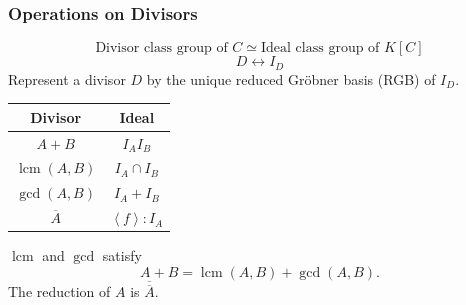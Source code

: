 \documentclass{beamer}
\newcommand{\pid}[1]{\left\langle #1 \right\rangle}
\newcommand{\bb}[1]{\mathbb{#1}}
\DeclareMathOperator{\Char}{char}
\DeclareMathOperator{\lcm}{lcm}
\renewcommand{\bar}{\overline}
\begin{document}

\begin{frame}
\frametitle{Operations on Divisors}
  \[ \text{Divisor class group of $C$} \simeq \text{Ideal class group of $K[C]$}\]
  \[ D \longleftrightarrow I_D \]
  Represent a divisor $D$ by the unique reduced Gr\"obner basis (RGB) of $I_D$. \\
  \begin{center}
    \begin{tabular}{c|c}
      Divisor & Ideal \\
      \hline
      $A + B$ & $I_A I_B$ \\
      $\lcm(A,B)$ & $I_A \cap I_B$ \\
      $\gcd(A,B)$ & $I_A + I_B$ \\
      $\bar A$ & $\pid{f} : I_A$
    \end{tabular}
  \end{center}
  $\lcm$ and $\gcd$ satisfy
  \[ A + B = \lcm(A, B) + \gcd(A, B). \]
  The reduction of $A$ is $\bar{\bar A}$.
\end{frame}

\end{document}
